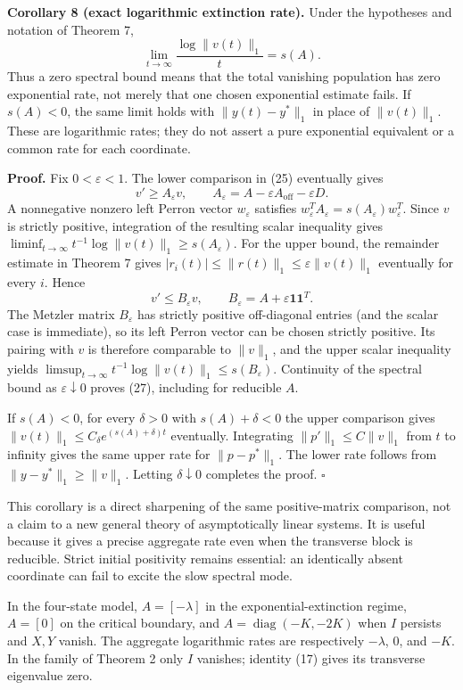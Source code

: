 \documentclass[
  11pt,
  a4paper,
]{scrartcl}
\begin{document}
\textbf{Corollary 8 (exact logarithmic extinction rate).} Under the
hypotheses and notation of Theorem 7, \[
\lim_{t\to\infty}\frac{\log\|v(t)\|_1}{t}=s(A).
\tag{27}
\] Thus a zero spectral bound means that the total vanishing population
has zero exponential rate, not merely that one chosen exponential
estimate fails. If \(s(A)<0\), the same limit holds with
\(\|y(t)-y^*\|_1\) in place of \(\|v(t)\|_1\). These are logarithmic
rates; they do not assert a pure exponential equivalent or a common rate
for each coordinate.

\textbf{Proof.} Fix \(0<\varepsilon<1\). The lower comparison in (25)
eventually gives \[
v'\ge A_\varepsilon v,\qquad
A_\varepsilon=A-\varepsilon A_{\mathrm{off}}-\varepsilon D.
\] A nonnegative nonzero left Perron vector \(w_\varepsilon\) satisfies
\(w_\varepsilon^TA_\varepsilon=s(A_\varepsilon)w_\varepsilon^T\). Since
\(v\) is strictly positive, integration of the resulting scalar
inequality gives
\(\liminf_{t\to\infty}t^{-1}\log\|v(t)\|_1\ge s(A_\varepsilon)\). For
the upper bound, the remainder estimate in Theorem 7 gives
\(|r_i(t)|\le\|r(t)\|_1\le\varepsilon\|v(t)\|_1\) eventually for every
\(i\). Hence \[
v'\le B_\varepsilon v,\qquad
B_\varepsilon=A+\varepsilon\mathbf1\mathbf1^T.
\] The Metzler matrix \(B_\varepsilon\) has strictly positive
off-diagonal entries (and the scalar case is immediate), so its left
Perron vector can be chosen strictly positive. Its pairing with \(v\) is
therefore comparable to \(\|v\|_1\), and the upper scalar inequality
yields \(\limsup_{t\to\infty}t^{-1}\log\|v(t)\|_1\le s(B_\varepsilon)\).
Continuity of the spectral bound as \(\varepsilon\downarrow0\) proves
(27), including for reducible \(A\).

If \(s(A)<0\), for every \(\delta>0\) with \(s(A)+\delta<0\) the upper
comparison gives \(\|v(t)\|_1\le C_\delta e^{(s(A)+\delta)t}\)
eventually. Integrating \(\|p'\|_1\le C\|v\|_1\) from \(t\) to infinity
gives the same upper rate for \(\|p-p^*\|_1\). The lower rate follows
from \(\|y-y^*\|_1\ge\|v\|_1\). Letting \(\delta\downarrow0\) completes
the proof. \(\square\)

This corollary is a direct sharpening of the same positive-matrix
comparison, not a claim to a new general theory of asymptotically linear
systems. It is useful because it gives a precise aggregate rate even
when the transverse block is reducible. Strict initial positivity
remains essential: an identically absent coordinate can fail to excite
the slow spectral mode.

In the four-state model, \(A=[-\lambda]\) in the exponential-extinction
regime, \(A=[0]\) on the critical boundary, and
\(A=\operatorname{diag}(-K,-2K)\) when \(I\) persists and \(X,Y\)
vanish. The aggregate logarithmic rates are respectively \(-\lambda\),
\(0\), and \(-K\). In the family of Theorem 2 only \(I\) vanishes;
identity (17) gives its transverse eigenvalue zero.
\end{document}

